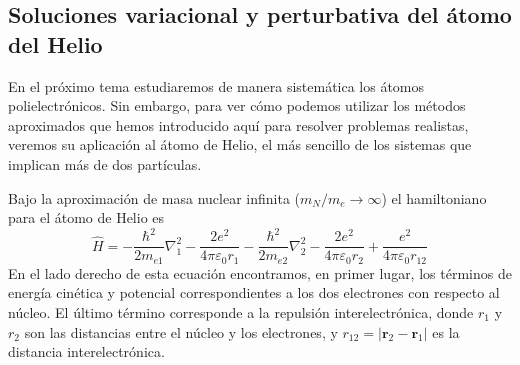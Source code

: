 
\subsection{Soluciones variacional y perturbativa del átomo del Helio}
En el próximo tema estudiaremos de manera sistemática 
los átomos polielectrónicos. Sin embargo, para ver cómo 
podemos utilizar los métodos aproximados que hemos introducido
aquí para resolver
problemas realistas, veremos su aplicación al
átomo de Helio, el más sencillo de los sistemas que
implican más de dos partículas. 

Bajo la aproximación de masa
nuclear infinita ($m_N/m_e\rightarrow \infty$)
el hamiltoniano para el átomo de Helio es
\begin{equation}
    \hat{H} = -\frac{\hbar^2}{2m_{e1}}\nabla^2_1 
    - \frac{2e^2}{4\pi\varepsilon_0r_1} 
    -\frac{\hbar^2}{2m_{e2}}\nabla^2_2 
    - \frac{2e^2}{4\pi\varepsilon_0r_2} 
            + \frac{e^2}{4\pi\varepsilon_0r_{12}}
\end{equation}
En el lado derecho de esta ecuación encontramos, en
primer lugar, los términos de energía
cinética y potencial correspondientes a los dos electrones
con respecto al núcleo. El último término corresponde a
la repulsión interelectrónica, donde $r_1$ y $r_2$ son las
distancias entre el núcleo y los electrones, y 
$r_{12}=|\mathbf{r}_2 - \mathbf{r}_1|$ 
es la distancia interelectrónica.

